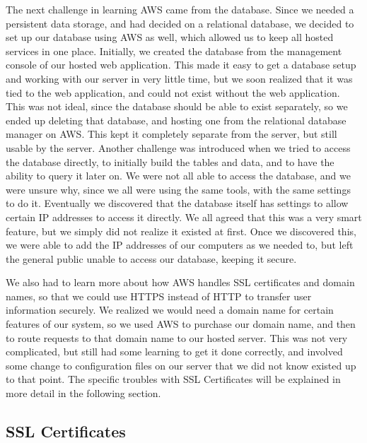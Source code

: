\documentclass[12pt]{report}
\let\Oldsubsection\subsection
\renewcommand{\subsection}{\FloatBarrier\Oldsubsection}
\begin{document}
The next challenge in learning AWS came from the database. Since we needed a
persistent data storage, and had decided on a relational database, we decided to set up our
database using AWS as well, which allowed us to keep all hosted services in one place. Initially,
we created the database from the management console of our hosted web application. This made
it easy to get a database setup and working with our server in very little time, but we soon
realized that it was tied to the web application, and could not exist without the web application.
This was not ideal, since the database should be able to exist separately, so we ended up deleting
that database, and hosting one from the relational database manager on AWS. This kept it
completely separate from the server, but still usable by the server. Another challenge was
introduced when we tried to access the database directly, to initially build the tables and data,
and to have the ability to query it later on. We were not all able to access the database, and we
were unsure why, since we all were using the same tools, with the same settings to do it.
Eventually we discovered that the database itself has settings to allow certain IP addresses to
access it directly. We all agreed that this was a very smart feature, but we simply did not realize
it existed at first. Once we discovered this, we were able to add the IP addresses of our
computers as we needed to, but left the general public unable to access our database, keeping it
secure.

We also had to learn more about how AWS handles SSL certificates and domain names,
so that we could use HTTPS instead of HTTP to transfer user information securely. We realized
we would need a domain name for certain features of our system, so we used AWS to purchase
our domain name, and then to route requests to that domain name to our hosted server. This was
not very complicated, but still had some learning to get it done correctly, and involved some
change to configuration files on our server that we did not know existed up to that point. The
specific troubles with SSL Certificates will be explained in more detail in the following section.

\subsection{SSL Certificates} \label{ssl-certificates}
\end{document}
